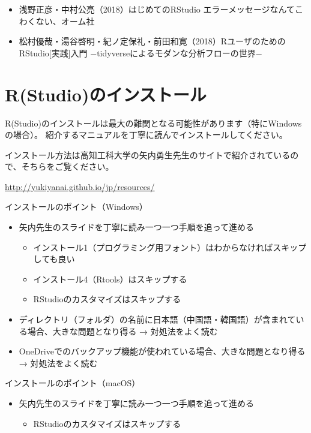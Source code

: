 \documentclass[]{book}
\providecommand{\tightlist}{%
  \setlength{\itemsep}{0pt}\setlength{\parskip}{0pt}}
\begin{document}
\begin{itemize}
\tightlist
\item
  浅野正彦・中村公亮（2018）はじめてのRStudio
  エラーメッセージなんてこわくない、オーム社
\item
  松村優哉・湯谷啓明・紀ノ定保礼・前田和寛（2018）RユーザのためのRStudio{[}実践{]}入門
  −tidyverseによるモダンな分析フローの世界−
\end{itemize}

\chapter{R(Studio)のインストール}\label{InstallR}

R(Studio)のインストールは最大の難関となる可能性があります（特にWindowsの場合）。
紹介するマニュアルを丁寧に読んでインストールしてください。

インストール方法は高知工科大学の矢内勇生先生のサイトで紹介されているので、そちらをご覧ください。

\url{http://yukiyanai.github.io/jp/resources/}

インストールのポイント（Windows）

\begin{itemize}
\tightlist
\item
  矢内先生のスライドを丁寧に読み一つ一つ手順を追って進める

  \begin{itemize}
  \tightlist
  \item
    インストール1（プログラミング用フォント）はわからなければスキップしても良い
  \item
    インストール4（Rtools）はスキップする
  \item
    RStudioのカスタマイズはスキップする
  \end{itemize}
\item
  ディレクトリ（フォルダ）の名前に日本語（中国語・韓国語）が含まれている場合、大きな問題となり得る
  → 対処法をよく読む
\item
  OneDriveでのバックアップ機能が使われている場合、大きな問題となり得る →
  対処法をよく読む
\end{itemize}

インストールのポイント（macOS）

\begin{itemize}
\tightlist
\item
  矢内先生のスライドを丁寧に読み一つ一つ手順を追って進める

  \begin{itemize}
  \tightlist
  \item
    RStudioのカスタマイズはスキップする
  \end{itemize}
\end{itemize}
\end{document}
